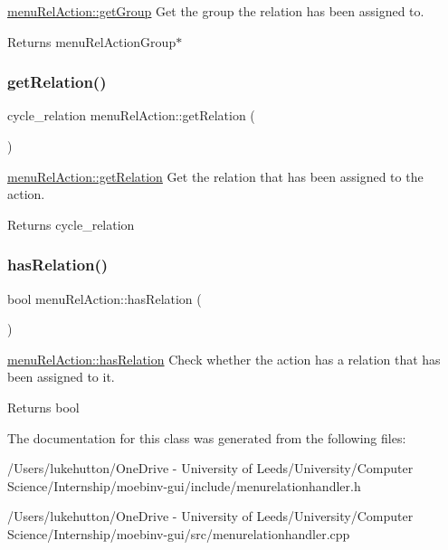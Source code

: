\mbox{\hyperlink{classmenu_rel_action_aca0baeed9c6a266d677dae8dfb25d65b}{menu\+Rel\+Action\+::get\+Group}} Get the group the relation has been assigned to. 

\begin{DoxyReturn}{Returns}
menu\+Rel\+Action\+Group$\ast$ 
\end{DoxyReturn}
\mbox{\label{classmenu_rel_action_a34deae132c511b7e34af97585df9245c}} 
\subsubsection{\texorpdfstring{get\+Relation()}{getRelation()}}
{\footnotesize\ttfamily cycle\+\_\+relation menu\+Rel\+Action\+::get\+Relation (\begin{DoxyParamCaption}{ }\end{DoxyParamCaption})}



\mbox{\hyperlink{classmenu_rel_action_a34deae132c511b7e34af97585df9245c}{menu\+Rel\+Action\+::get\+Relation}} Get the relation that has been assigned to the action. 

\begin{DoxyReturn}{Returns}
cycle\+\_\+relation 
\end{DoxyReturn}
\mbox{\label{classmenu_rel_action_a5e6339dbaf4cf0dc9543afdfc5b9e15a}} 
\subsubsection{\texorpdfstring{has\+Relation()}{hasRelation()}}
{\footnotesize\ttfamily bool menu\+Rel\+Action\+::has\+Relation (\begin{DoxyParamCaption}{ }\end{DoxyParamCaption})}



\mbox{\hyperlink{classmenu_rel_action_a5e6339dbaf4cf0dc9543afdfc5b9e15a}{menu\+Rel\+Action\+::has\+Relation}} Check whether the action has a relation that has been assigned to it. 

\begin{DoxyReturn}{Returns}
bool 
\end{DoxyReturn}


The documentation for this class was generated from the following files\+:\begin{DoxyCompactItemize}
\item 
/\+Users/lukehutton/\+One\+Drive -\/ University of Leeds/\+University/\+Computer Science/\+Internship/moebinv-\/gui/include/menurelationhandler.\+h\item 
/\+Users/lukehutton/\+One\+Drive -\/ University of Leeds/\+University/\+Computer Science/\+Internship/moebinv-\/gui/src/menurelationhandler.\+cpp\end{DoxyCompactItemize}
